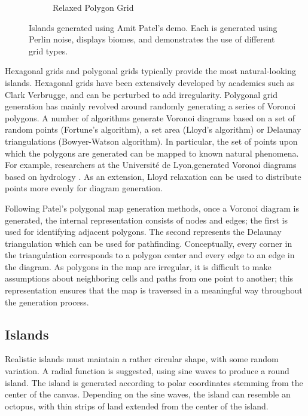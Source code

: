 \begin{figure}
\begin{subfigure}[b]{0.45\textwidth}
                \caption{Relaxed Polygon Grid}
                \label{fig:Relaxed}
        \end{subfigure}
        \caption{Islands generated using Amit Patel's demo. Each is generated using Perlin noise, displays biomes, and demonstrates the use of different grid types.}\label{fig:gridtypes}
\end{figure}

Hexagonal grids and polygonal grids typically provide the most natural-looking islands. Hexagonal grids have been extensively developed by academics such as Clark Verbrugge\cite{Verbrugge:1997:Online}, and can be perturbed to add irregularity. Polygonal grid generation has mainly revolved around randomly generating a series of Voronoi polygons. A number of algorithms generate Voronoi diagrams based on a set of random points (Fortune's algorithm\cite{Fortune:1986:SAV:10515.10549}), a set area (Lloyd's algorithm\cite{doi:10.1137/S0036144599352836}) or Delaunay triangulations (Bowyer-Watson algorithm\cite{Watson01011981}). In particular, the set of points upon which the polygons are generated can be mapped to known natural phenomena. For example, researchers at the Universit\'{e} de Lyon,generated Voronoi diagrams based on hydrology \cite{Genevaux:2013:TGU:2461912.2461996}. As an extension, Lloyd relaxation can be used to distribute points more evenly for diagram generation. 

Following Patel's polygonal map generation methods, once a Voronoi diagram is generated, the internal representation consists of nodes and edges; the first is used for identifying adjacent polygons. The second represents the Delaunay triangulation which can be used for pathfinding. Conceptually, every corner in the triangulation corresponds to a polygon center and every edge to an edge in the diagram. As polygons in the map are irregular, it is difficult to make assumptions about neighboring cells and paths from one point to another; this representation ensures that the map is traversed in a meaningful way throughout the generation process. 

\subsection{Islands}

Realistic islands must maintain a rather circular shape, with some random variation. A radial function is suggested, using sine waves to produce a round island. The island is generated according to polar coordinates stemming from the center of the canvas. Depending on the sine waves, the island can resemble an octopus, with thin strips of land extended from the center of the island.  

